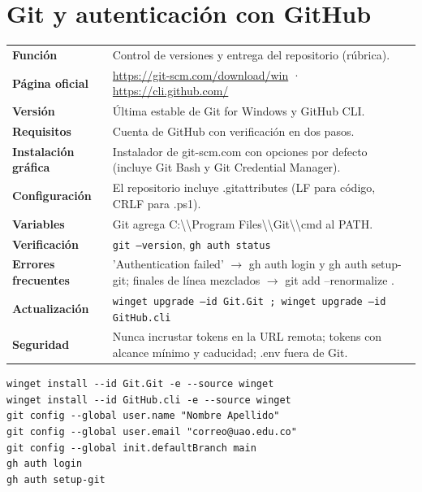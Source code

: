 \section{Git y autenticación con GitHub}
{\small\begin{tabularx}{\linewidth}{@{}>{\bfseries}p{2.9cm}X@{}}\toprule
Función & Control de versiones y entrega del repositorio (rúbrica).\\
Página oficial & \url{https://git-scm.com/download/win} · \url{https://cli.github.com/}\\
Versión & Última estable de Git for Windows y GitHub CLI.\\
Requisitos & Cuenta de GitHub con verificación en dos pasos.\\
Instalación gráfica & Instalador de git-scm.com con opciones por defecto (incluye Git Bash y Git Credential Manager).\\
Configuración & El repositorio incluye .gitattributes (LF para código, CRLF para .ps1).\\
Variables & Git agrega C:\textbackslash{}\textbackslash{}Program Files\textbackslash{}\textbackslash{}Git\textbackslash{}\textbackslash{}cmd al PATH.\\
Verificación & \texttt{git --version}, \texttt{gh auth status}\\
Errores frecuentes & 'Authentication failed' $\rightarrow$ gh auth login y gh auth setup-git; finales de línea mezclados $\rightarrow$ git add --renormalize .\\
Actualización & \texttt{winget upgrade --id Git.Git ; winget upgrade --id GitHub.cli}\\
Seguridad & Nunca incrustar tokens en la URL remota; tokens con alcance mínimo y caducidad; .env fuera de Git.\\
\bottomrule\end{tabularx}}
\begin{lstlisting}[style=ps]
winget install --id Git.Git -e --source winget
winget install --id GitHub.cli -e --source winget
git config --global user.name "Nombre Apellido"
git config --global user.email "correo@uao.edu.co"
git config --global init.defaultBranch main
gh auth login
gh auth setup-git
\end{lstlisting}

